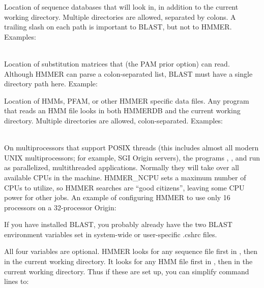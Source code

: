 \begin{wideitem}
\item [\emprog{BLASTDB}] Location of sequence databases that
	 will look in, in addition to the current
	working directory.
	Multiple directories are allowed, separated by colons. A
	trailing slash on each path is important to BLAST, but not to HMMER.\\
	Examples: \\
	\\

\item [\emprog{BLASTMAT}] Location of substitution matrices that
	 (the PAM prior option) can read.
	Although HMMER can parse a colon-separated list, BLAST must
	have a single directory path here.
	Example:\\

\item [\emprog{HMMERDB}] Location of HMMs, PFAM, or other HMMER
	specific data files. Any program that reads an HMM file
	looks in both HMMERDB and the current working directory.
	Multiple directories are allowed, colon-separated.
	Examples:\\
	\\

\item [\emprog{HMMER\_NCPU}] On multiprocessors that support POSIX
	threads (this includes almost all modern UNIX multiprocessors;
	for example, SGI Origin servers), the programs
	, , and 
	run as parallelized, multithreaded applications.
	Normally they will take over all available CPUs in the machine.
	HMMER\_NCPU sets a maximum number of CPUs to utilize,
	so HMMER searches are ``good citizens'', leaving some
 	CPU power for other jobs. An example of configuring
	HMMER to use only 16 processors on a 32-processor Origin:\\
\end{wideitem}

If you have installed BLAST, you probably already have the two BLAST
environment variables set in system-wide or user-specific .cshrc
files.

All four variables are optional. HMMER looks for any sequence file
first in , then in the current working directory. It
looks for any HMM file first in , then in the current
working directory. Thus if these are set up, you can simplify command
lines to:

